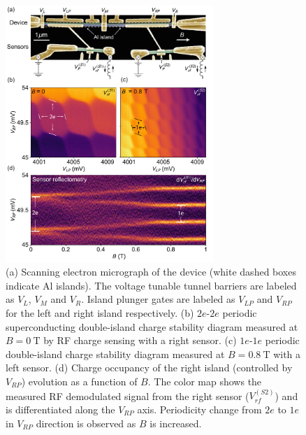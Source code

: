 \begin{figure}
	\includegraphics[width=0.7\textwidth]{Fig4-21.pdf}
	\caption[RF charge sensing of double Majorana island]{(a) Scanning electron micrograph of the device (white dashed boxes indicate Al islands). The voltage tunable tunnel barriers are labeled as $V_{L}$, $V_{M}$ and $V_{R}$. Island plunger gates are labeled as $V_{LP}$ and $V_{RP}$ for the left and right island respectively. (b) $2e$-$2e$ periodic superconducting double-island charge stability diagram measured at $B = \SI{0}{\tesla}$ by RF charge sensing with a right sensor. (c) $1e$-$1e$ periodic double-island charge stability diagram measured at $B = \SI{0.8}{\tesla}$ with a left sensor. (d) Charge occupancy of the right island (controlled by $V_{RP}$) evolution as a function of $B$. The color map shows the measured RF demodulated signal from the right sensor ($V^{(S2)}_{rf}$) and is differentiated along the $V_{RP}$ axis. Periodicity change from $2e$ to $1e$ in $V_{RP}$ direction is observed as $B$ is increased.}
	\label{fig:majo_d}
\end{figure}

